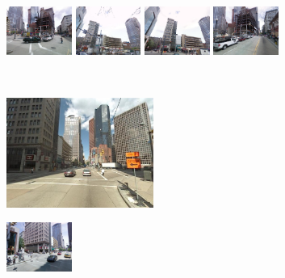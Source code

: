 \begin{figure}[t!]
\begin{minipage}{0.75\linewidth}
\begin{minipage}{\linewidth}
                \colorbox{myRed}{\includegraphics[height=16mm]{imgs/ex1/FV1.jpg}}
                \colorbox{myRed}{\includegraphics[height=16mm]{imgs/ex1/FV2.jpg}}
                \colorbox{myRed}{\includegraphics[height=16mm]{imgs/ex1/FV3.jpg}}
                \colorbox{myRed}{\includegraphics[height=16mm]{imgs/ex1/FV4.jpg}}
            \end{minipage} 
        \end{minipage}
        \\
        \begin{minipage}{0.34\linewidth}
            \centering
            \vspace{0mm}
            \includegraphics[height=36mm]{imgs/ex2/query.jpg}
        \end{minipage}
        \begin{minipage}{0.75\linewidth}
            \begin{minipage}{\linewidth} 
                \colorbox{myGreen}{\includegraphics[height=16mm]{imgs/ex2/FVsvm1.jpg}}

\end{minipage}
\end{minipage}
\end{figure}
